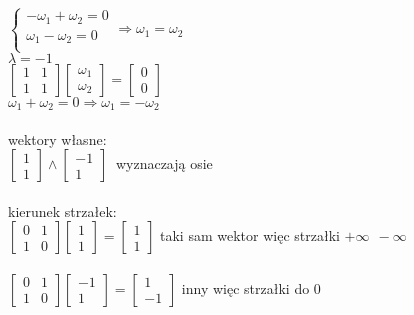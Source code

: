 \begin{multicols}{2}
$ \begin{cases} -\omega_1+\omega_2 =0\\ \omega_1-\omega_2=0\\\end{cases}\Rightarrow \omega_1=\omega_2$\\
$\boxed{\lambda=-1}$\\
$\left[\begin{array}{cc}1&1\\1&1\end{array}\right]\left[\begin{array}{c}\omega_1\\ \omega_2\end{array}\right]=\left[\begin{array}{c}0\\0\end{array}\right]$\\
$ \omega_1+\omega_2 = 0\Rightarrow \omega_1=-\omega_2$\\
\\
wektory własne:\\
$\left[\begin{array}{c}1\\1\end{array}\right] \wedge \left[\begin{array}{c}-1\\1\end{array}\right] \ $ wyznaczają osie\\\\
kierunek strzałek:\\
$\left[\begin{array}{cc}0&1\\1&0\end{array}\right]\left[\begin{array}{c}1\\1\end{array}\right]=\left[\begin{array}{c}1\\1\end{array}\right]$ taki sam wektor więc strzałki $+\infty \ \ -\infty$\\\\
$\left[\begin{array}{cc}0&1\\1&0\end{array}\right]\left[\begin{array}{c}-1\\1\end{array}\right]=\left[\begin{array}{c}1\\-1\end{array}\right]$ inny więc strzałki do 0\\

\end{multicols}
